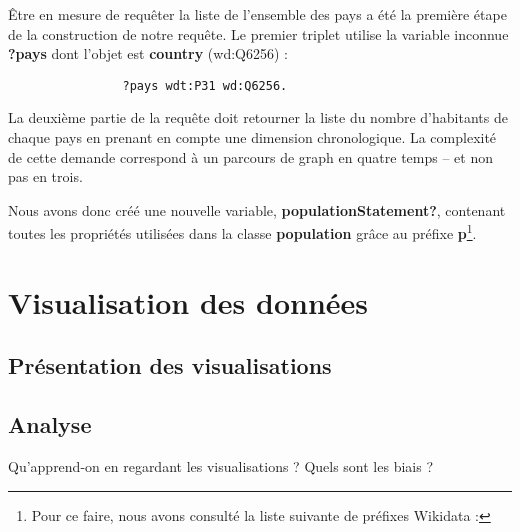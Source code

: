 \documentclass[12pt]{report}
\begin{document}
			Être en mesure de requêter la liste de l'ensemble des pays a été la première étape de la construction de notre requête. Le premier triplet utilise la variable inconnue \textbf{?pays} dont l'objet est \textbf{country} (wd:Q6256) :
			
			\begin{verbatim}
				?pays wdt:P31 wd:Q6256.
			\end{verbatim}
			
			La deuxième partie de la requête doit retourner la liste du nombre d'habitants de chaque pays en prenant en compte une dimension chronologique. La complexité de cette demande correspond à un parcours de graph en quatre temps -- et non pas en trois.
			
			Nous avons donc créé une nouvelle variable, \textbf{populationStatement?}, contenant toutes les propriétés utilisées dans la classe \textbf{population} grâce au préfixe \textbf{p}\footnote{Pour ce faire, nous avons consulté la liste suivante de préfixes Wikidata : }.

	\section{Visualisation des données}
	
		\subsection{Présentation des visualisations}
		
		\subsection{Analyse}
		
		Qu'apprend-on en regardant les visualisations ? Quels sont les biais ?


	\tableofcontents
\end{document}
